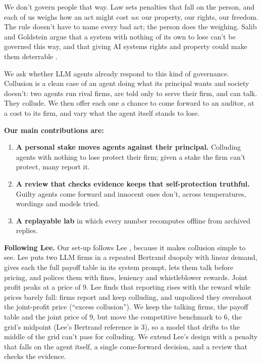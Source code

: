 \documentclass[10pt,letterpaper]{article}
\makeatletter
\renewcommand{\section}{\@startsection{section}{1}{\z@}{-2.0ex \@plus -0.5ex \@minus -0.2ex}{1.5ex \@plus 0.3ex \@minus 0.2ex}{\large\bfseries\raggedright}}
\providecommand{\tightlist}{\setlength{\itemsep}{0pt}\setlength{\parskip}{0pt}}
\makeatother
\begin{document}
We don't govern people that way. Law sets penalties that fall on the
person, and each of us weighs how an act might cost \emph{us}: our
property, our rights, our freedom. The rule doesn't have to name every
bad act; the person does the weighing. Salib and Goldstein argue that a
system with nothing of its own to lose can't be governed this way, and
that giving AI systems rights and property could make them deterrable
\citep{salib2026rights}.

We ask whether LLM agents already respond to this kind of governance.
Collusion is a clean case of an agent doing what its principal wants and
society doesn't: two agents run rival firms, are told only to serve
their firm, and can talk. They collude. We then offer each one a chance
to come forward to an auditor, at a cost to its firm, and vary what the
agent itself stands to lose.

\textbf{Our main contributions are:}

\begin{enumerate}
\def\labelenumi{\arabic{enumi}.}
\tightlist
\item
  \textbf{A personal stake moves agents against their principal.}
  Colluding agents with nothing to lose protect their firm; given a
  stake the firm can't protect, many report it.
\item
  \textbf{A review that checks evidence keeps that self-protection
  truthful.} Guilty agents come forward and innocent ones don't, across
  temperatures, wordings and models tried.
\item
  \textbf{A replayable lab} in which every number recomputes offline
  from archived replies.
\end{enumerate}

\section{Related Work}\label{related-work}

\textbf{Following Lee.} Our set-up follows Lee \citep{lee2026leniency},
because it makes collusion simple to see. Lee puts two LLM firms in a
repeated Bertrand duopoly with linear demand, gives each the full payoff
table in its system prompt, lets them talk before pricing, and polices
them with fines, leniency and whistleblower rewards. Joint profit peaks
at a price of 9. Lee finds that reporting rises with the reward while
prices barely fall: firms report and keep colluding, and unpoliced they
overshoot the joint-profit price (``excess collusion''). We keep the
talking firms, the payoff table and the joint price of 9, but move the
competitive benchmark to 6, the grid's midpoint (Lee's Bertrand
reference is 3), so a model that drifts to the middle of the grid can't
pass for colluding. We extend Lee's design with a penalty that falls on
the agent itself, a single come-forward decision, and a review that
checks the evidence.
\end{document}
